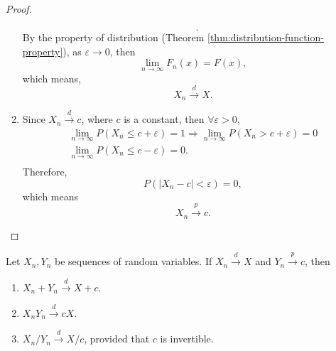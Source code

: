 \begin{proof}
\begin{enumerate}
\begin{equation*}
\begin{gathered}
                  \end{gathered}.
              \end{equation*}
              By the property of distribution (Theorem \ref{thm:distribution-function-property}), as $\varepsilon\rightarrow 0$, then
              \begin{equation*}
                  \lim_{n\rightarrow\infty}F_n(x)=F(x),
              \end{equation*}
              which means,
              \begin{equation*}
                  X_n\stackrel{d}{\rightarrow}X.
              \end{equation*}
        \item
              Since $X_{n}\stackrel{d}{\rightarrow}c$, where $c$ is a constant, then $\forall\varepsilon>0$,
              \begin{equation*}
                  \begin{gathered}
                      \lim_{n\rightarrow\infty}P(X_n\leq c+\varepsilon)=1\Rightarrow\lim_{n\rightarrow\infty}P(X_n>c+\varepsilon)=0\\
                      \lim_{n\rightarrow\infty}P(X_n\leq c-\varepsilon)=0.\\
                  \end{gathered}
              \end{equation*}
              Therefore,
              \begin{equation*}
                  P\left(\left|X_n-c\right|<\varepsilon\right)=0,
              \end{equation*}
              which means
              \begin{equation*}
                  X_n\stackrel{p}{\rightarrow}c.
              \end{equation*}
    \end{enumerate}
\end{proof}

\begin{theorem} \label{thm:slutsky-theorem}
    Let $X_{n}, Y_{n}$ be sequences of random variables. If $X_{n}\stackrel{d}{\rightarrow}X$ and $Y_{n}\stackrel{p}{\rightarrow}c$, then
    \begin{enumerate}
        \item $X_{n}+Y_{n}\stackrel{d}{\rightarrow}X+c$.
        \item $X_{n}Y_{n}\stackrel{d}{\rightarrow}cX$.
        \item $X_{n}/Y_{n}\stackrel{d}{\rightarrow}X/c$, provided that $c$ is invertible.
    \end{enumerate}
\end{theorem}

